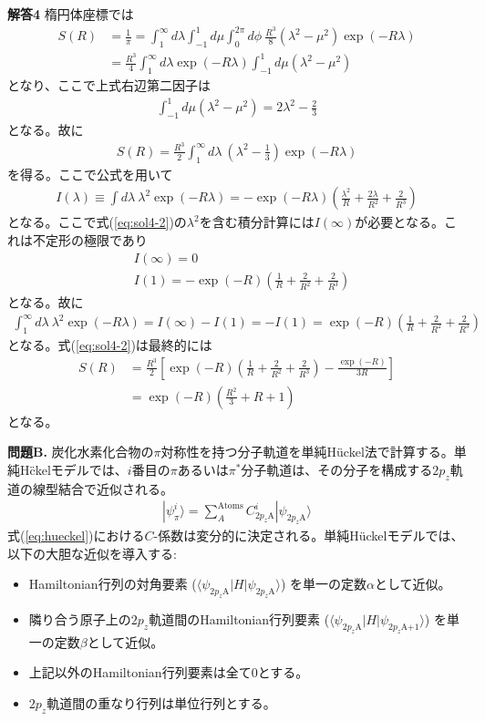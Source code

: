 \documentclass[11pt,pra,aps]{revtex4}
\begin{document}
\noindent
{\bf 解答4}
楕円体座標では
\begin{align}
  S(R)&=\frac{1}{\pi}=\int_1^\infty d\lambda\int_{-1}^{1} d\mu\int^{2\pi}_0d \phi  \ \frac{R^3}{8}(\lambda^2-\mu^2)\exp(-R\lambda)  \nonumber \\
  &=\frac{R^3}{4}\int_1^\infty d\lambda\exp(-R\lambda)\int_{-1}^{1} d\mu (\lambda^2-\mu^2) \label{eq:sol4-1}
\end{align}
となり、ここで上式右辺第二因子は
\begin{align}
  \int_{-1}^{1} d\mu (\lambda^2-\mu^2) = 2\lambda^2-\frac{2}{3}
\end{align}
となる。故に
\begin{align}
  S(R)=\frac{R^3}{2} \int_1^\infty d\lambda \ \left(\lambda^2-\frac{1}{3}\right) \exp(-R\lambda) \label{eq:sol4-2}
\end{align}
を得る。ここで公式を用いて
\begin{align}
  I(\lambda)\equiv\int d\lambda \ \lambda^2 \exp(-R\lambda) = -\exp(-R\lambda)\left(\frac{\lambda^2}{R}+\frac{2\lambda}{R^2}+\frac{2}{R^3}\right)
\end{align}
となる。ここで式(\ref{eq:sol4-2})の$\lambda^2$を含む積分計算には$I(\infty)$が必要となる。これは不定形の極限であり
\begin{align}
  &I(\infty)=0 \\
  &I(1)=-\exp(-R)\left(\frac{1}{R}+\frac{2}{R^2}+\frac{2}{R^3}\right)
\end{align}  
となる。故に
\begin{align}
  \int_1^\infty d\lambda \ \lambda^2 \exp(-R\lambda)=I(\infty)-I(1)=-I(1)=\exp(-R)\left(\frac{1}{R}+\frac{2}{R^2}+\frac{2}{R^3}\right)
\end{align}
となる。式(\ref{eq:sol4-2})は最終的には
\begin{align}
  S(R)&=\frac{R^3}{2}\left[\exp(-R)\left(\frac{1}{R}+\frac{2}{R^2}+\frac{2}{R^3}\right) - \frac{\exp(-R)}{3R}\right] \nonumber \\
  &=\exp(-R)\left(\frac{R^2}{3}+R+1\right)
\end{align}
となる。

\noindent
    {\bf 問題B.} 炭化水素化合物の$\pi$対称性を持つ分子軌道を単純H\"uckel法で計算する。単純H\"ckelモデルでは、$i$番目の$\pi$あるいは$\pi^*$分子軌道は、その分子を構成する$2p_z$軌道の線型結合で近似される。
\begin{align}
  |\psi_\pi^i\rangle=\sum_A^\text{Atoms}C^i_{2p_z\text{A}}|\psi_{2p_z\text{A}}\rangle \label{eq:hueckel}
\end{align}
式(\ref{eq:hueckel})における$C$-係数は変分的に決定される。単純H\"uckelモデルでは、以下の大胆な近似を導入する:
\begin{itemize}
\item Hamiltonian行列の対角要素 ($\langle\psi_{2p_z\text{A}}|H|\psi_{2p_z\text{A}}\rangle$) を単一の定数$\alpha$として近似。
\item 隣り合う原子上の$2p_z$軌道間のHamiltonian行列要素 ($\langle\psi_{2p_z\text{A}}|H|\psi_{2p_z\text{A+1}}\rangle$) を単一の定数$\beta$として近似。
\item 上記以外のHamiltonian行列要素は全て0とする。
\item $2p_z$軌道間の重なり行列は単位行列とする。
\end{itemize}
\end{document}
